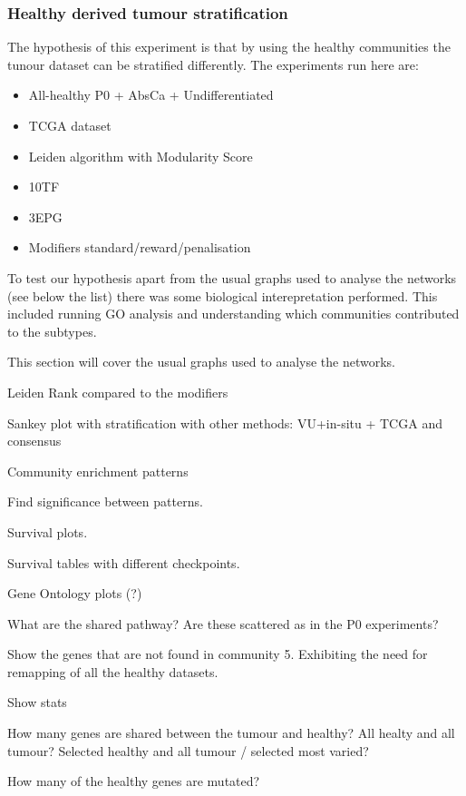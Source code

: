 \subsubsection{Healthy derived tumour stratification} \label{Sec:N_I:h_derived}

The hypothesis of this experiment is that by using the healthy communities the tunour dataset can be stratified differently. The experiments run here are:
\begin{itemize}
    \item All-healthy \- P0 + AbsCa + Undifferentiated
    \item TCGA dataset
    \item Leiden algorithm with Modularity Score
    \item 10TF
    \item 3EPG
    \item Modifiers standard/reward/penalisation
\end{itemize}

To test our hypothesis apart from the usual graphs used to analyse the networks (see below the list) there was some biological interepretation performed. This included running GO analysis and understanding which communities contributed to the subtypes.

This section will cover the usual graphs used to analyse the networks.
\begin{todolist}
    \item[\done] Leiden Rank compared to the modifiers
    \item[\done] Sankey plot with stratification with other methods: VU+in-situ + TCGA and consensus
    \item[\done] Community enrichment patterns
    \item Find significance between patterns.
    \item [\done] Survival plots.
    \item Survival tables with different checkpoints.
    \item Gene Ontology plots (?)
    \item What are the shared pathway? Are these scattered as in the P0 experiments?
    \item Show the genes that are not found in community 5. Exhibiting the need for remapping of all the healthy datasets.
    \item Show stats
    \begin{todolist}
        \item How many genes are shared between the tumour and healthy? All healty and all tumour? Selected healthy and all tumour / selected most varied?
        \item How many of the healthy genes are mutated?
    \end{todolist}
\end{todolist}


